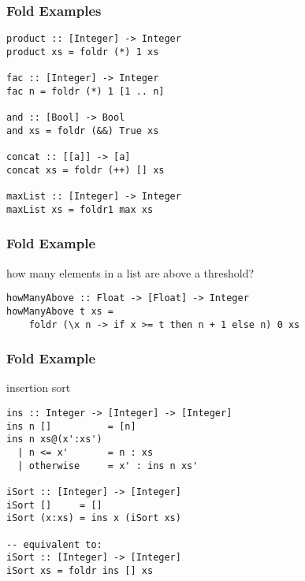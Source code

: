 \documentclass[dvipsnames]{beamer}
\theoremstyle{plain}
\begin{document}
\begin{frame}[fragile]
  \frametitle{Fold Examples}

  \begin{exampleblock}{}
    \begin{lstlisting}[deletekeywords={and, concat, product}]
product :: [Integer] -> Integer
product xs = foldr (*) 1 xs

fac :: [Integer] -> Integer
fac n = foldr (*) 1 [1 .. n]

and :: [Bool] -> Bool
and xs = foldr (&&) True xs

concat :: [[a]] -> [a]
concat xs = foldr (++) [] xs

maxList :: [Integer] -> Integer
maxList xs = foldr1 max xs
    \end{lstlisting}
  \end{exampleblock}
\end{frame}

\begin{frame}[fragile]
  \frametitle{Fold Example}

  \begin{exampleblock}{how many elements in a list are above a threshold?}
    \begin{lstlisting}
howManyAbove :: Float -> [Float] -> Integer
howManyAbove t xs =
    foldr (\x n -> if x >= t then n + 1 else n) 0 xs
    \end{lstlisting}
  \end{exampleblock}
\end{frame}

\begin{frame}[fragile]
  \frametitle{Fold Example}

  \begin{exampleblock}{insertion sort}
    \begin{lstlisting}
ins :: Integer -> [Integer] -> [Integer]
ins n []          = [n]
ins n xs@(x':xs')
  | n <= x'       = n : xs
  | otherwise     = x' : ins n xs'

iSort :: [Integer] -> [Integer]
iSort []     = []
iSort (x:xs) = ins x (iSort xs)

-- equivalent to:
iSort :: [Integer] -> [Integer]
iSort xs = foldr ins [] xs
    \end{lstlisting}
  \end{exampleblock}
\end{frame}
\end{document}
